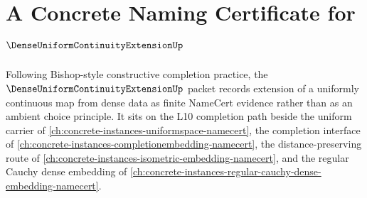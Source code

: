 \chapter{A Concrete Naming Certificate for $\DenseUniformContinuityExtensionUp$}
\label{ch:concrete-instances-dense-uniform-continuity-extension-namecert}

Following Bishop-style constructive completion practice, the $\DenseUniformContinuityExtensionUp$ packet records extension of a uniformly continuous map from dense data as finite NameCert evidence rather than as an ambient choice principle. It sits on the L10 completion path beside the uniform carrier of \autoref{ch:concrete-instances-uniformspace-namecert}, the completion interface of \autoref{ch:concrete-instances-completionembedding-namecert}, the distance-preserving route of \autoref{ch:concrete-instances-isometric-embedding-namecert}, and the regular Cauchy dense embedding of \autoref{ch:concrete-instances-regular-cauchy-dense-embedding-namecert}.

